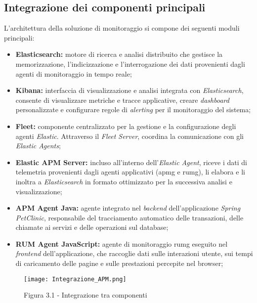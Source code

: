 \subsection{Integrazione dei componenti principali}
L'architettura della soluzione di monitoraggio si compone dei seguenti moduli principali:
\begin{itemize}
    \item \textbf{Elasticsearch:} motore di ricerca e analisi distribuito che gestisce la memorizzazione, l'indicizzazione e l'interrogazione dei dati provenienti dagli agenti di monitoraggio in tempo reale;
    
    \item \textbf{Kibana:} interfaccia di visualizzazione e analisi integrata con \emph{Elasticsearch}, consente di visualizzare metriche e tracce applicative, creare \emph{dashboard} personalizzate e configurare regole di \emph{alerting} per il monitoraggio del sistema;
    
    \item \textbf{Fleet:} componente centralizzato per la gestione e la configurazione degli agenti \emph{Elastic}. Attraverso il \emph{Fleet Server}, coordina la comunicazione con gli \emph{Elastic Agents};
    
    \item \textbf{Elastic APM Server:} incluso all'interno dell'\emph{Elastic Agent}, riceve i dati di telemetria provenienti dagli agenti applicativi (\gls{apmg} e \gls{rumg}\glsfirstoccur), li elabora e li inoltra a \emph{Elasticsearch} in formato ottimizzato per la successiva analisi e visualizzazione;
    
    \item \textbf{APM Agent Java:} agente integrato nel \emph{backend} dell'applicazione \emph{Spring PetClinic}, responsabile del tracciamento automatico delle transazioni, delle chiamate ai servizi e delle operazioni sul database;
    
    \item \textbf{RUM Agent JavaScript:} agente di monitoraggio \gls{rumg} eseguito nel \emph{frontend} dell'applicazione, che raccoglie dati sulle interazioni utente, sui tempi di caricamento delle pagine e sulle prestazioni percepite nel browser;
    
\end{itemize}


\begin{figure}[!h] 
    \centering 
    \texttt{[image: Integrazione\_APM.png]} 
    \caption{Figura 3.1 - Integrazione tra componenti}
\end{figure}


